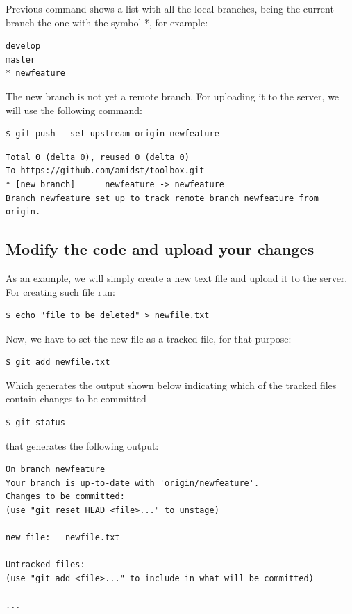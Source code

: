 \documentclass[10pt,a4paper]{article}
\begin{document}
\noindent Previous command shows a list with all the local branches, being the current
branch the one with the symbol *, for example:


\begin{verbatim}
develop
master
* newfeature
\end{verbatim}

\noindent The new branch is not yet a remote branch. For uploading it to the
server, we will use the following command:

\begin{verbatim}
$ git push --set-upstream origin newfeature
\end{verbatim}



\begin{verbatim}
Total 0 (delta 0), reused 0 (delta 0)
To https://github.com/amidst/toolbox.git
* [new branch]      newfeature -> newfeature
Branch newfeature set up to track remote branch newfeature from origin.
\end{verbatim}


\subsection{Modify the code and upload your changes }\label{modify-the-code-and-upload-your-changes}

As an example, we will simply create a new text file and upload it to
the server. For creating such file run:

\begin{verbatim}
$ echo "file to be deleted" > newfile.txt
\end{verbatim}


\noindent Now, we have to set the new file as a tracked file, for that
purpose:\newline 

\begin{verbatim}
$ git add newfile.txt 
\end{verbatim}


\noindent Which generates the output shown below indicating which of the tracked
files contain changes to be committed\newline

\begin{verbatim}
$ git status
\end{verbatim}


\noindent that generates the following output:

\begin{verbatim}
On branch newfeature
Your branch is up-to-date with 'origin/newfeature'.
Changes to be committed:
(use "git reset HEAD <file>..." to unstage)

new file:   newfile.txt

Untracked files:
(use "git add <file>..." to include in what will be committed)

...
\end{verbatim}
\end{document}
